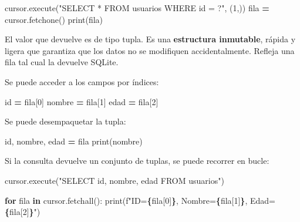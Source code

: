 \documentclass[
]{book}
\newenvironment{Shaded}{\begin{snugshade}}{\end{snugshade}}
\newcommand{\BuiltInTok}[1]{#1}
\newcommand{\ControlFlowTok}[1]{\textcolor[rgb]{0.13,0.29,0.53}{\textbf{#1}}}
\newcommand{\DecValTok}[1]{\textcolor[rgb]{0.00,0.00,0.81}{#1}}
\newcommand{\KeywordTok}[1]{\textcolor[rgb]{0.13,0.29,0.53}{\textbf{#1}}}
\newcommand{\NormalTok}[1]{#1}
\newcommand{\OperatorTok}[1]{\textcolor[rgb]{0.81,0.36,0.00}{\textbf{#1}}}
\newcommand{\SpecialCharTok}[1]{\textcolor[rgb]{0.81,0.36,0.00}{\textbf{#1}}}
\newcommand{\SpecialStringTok}[1]{\textcolor[rgb]{0.31,0.60,0.02}{#1}}
\newcommand{\StringTok}[1]{\textcolor[rgb]{0.31,0.60,0.02}{#1}}
\theoremstyle{break}
\theoremstyle{nonumberplain}
\begin{document}
\begin{Shaded}
\begin{Highlighting}[]
\NormalTok{cursor.execute(}\StringTok{"SELECT * FROM usuarios WHERE id = ?"}\NormalTok{, (}\DecValTok{1}\NormalTok{,))}
\NormalTok{fila }\OperatorTok{=}\NormalTok{ cursor.fetchone()}
\BuiltInTok{print}\NormalTok{(fila)}
\end{Highlighting}
\end{Shaded}

El valor que devuelve es de tipo tupla.
Es una \textbf{estructura inmutable}, rápida y ligera que garantiza que los datos no se modifiquen accidentalmente.
Refleja una fila tal cual la devuelve SQLite.

Se puede acceder a los campos por índices:

\begin{Shaded}
\begin{Highlighting}[]
\BuiltInTok{id} \OperatorTok{=}\NormalTok{ fila[}\DecValTok{0}\NormalTok{]}
\NormalTok{nombre }\OperatorTok{=}\NormalTok{ fila[}\DecValTok{1}\NormalTok{]}
\NormalTok{edad }\OperatorTok{=}\NormalTok{ fila[}\DecValTok{2}\NormalTok{]}
\end{Highlighting}
\end{Shaded}

Se puede desempaquetar la tupla:

\begin{Shaded}
\begin{Highlighting}[]
\BuiltInTok{id}\NormalTok{, nombre, edad }\OperatorTok{=}\NormalTok{ fila}
\BuiltInTok{print}\NormalTok{(nombre)}
\end{Highlighting}
\end{Shaded}

Si la consulta devuelve un conjunto de tuplas, se puede recorrer en bucle:

\begin{Shaded}
\begin{Highlighting}[]
\NormalTok{cursor.execute(}\StringTok{"SELECT id, nombre, edad FROM usuarios"}\NormalTok{)}

\ControlFlowTok{for}\NormalTok{ fila }\KeywordTok{in}\NormalTok{ cursor.fetchall():}
    \BuiltInTok{print}\NormalTok{(}\SpecialStringTok{f"ID=}\SpecialCharTok{\{}\NormalTok{fila[}\DecValTok{0}\NormalTok{]}\SpecialCharTok{\}}\SpecialStringTok{, Nombre=}\SpecialCharTok{\{}\NormalTok{fila[}\DecValTok{1}\NormalTok{]}\SpecialCharTok{\}}\SpecialStringTok{, Edad=}\SpecialCharTok{\{}\NormalTok{fila[}\DecValTok{2}\NormalTok{]}\SpecialCharTok{\}}\SpecialStringTok{"}\NormalTok{)}
\end{Highlighting}
\end{Shaded}
\end{document}
